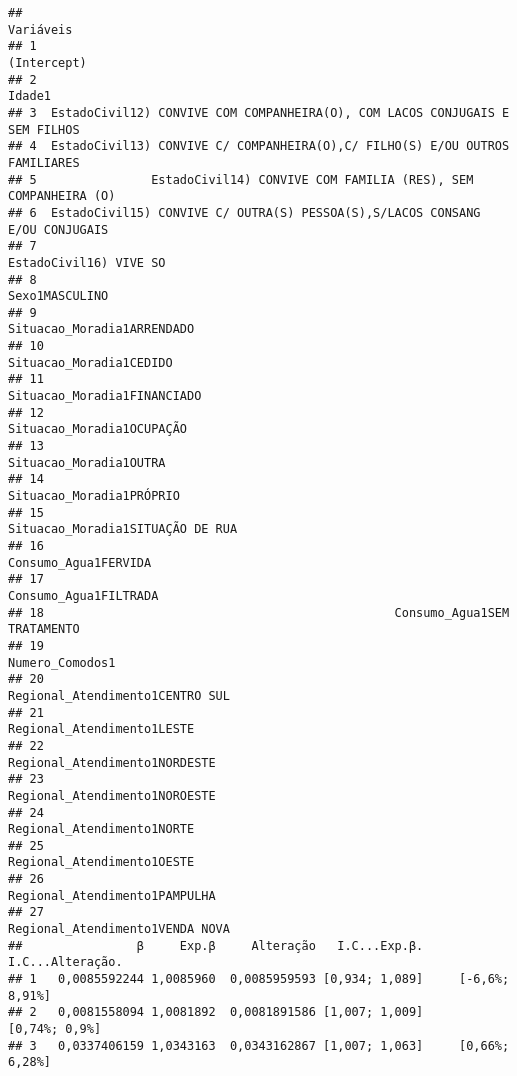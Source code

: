 \documentclass[
]{article}
\begin{document}
\begin{verbatim}
##                                                                      Variáveis
## 1                                                                  (Intercept)
## 2                                                                       Idade1
## 3  EstadoCivil12) CONVIVE COM COMPANHEIRA(O), COM LACOS CONJUGAIS E SEM FILHOS
## 4  EstadoCivil13) CONVIVE C/ COMPANHEIRA(O),C/ FILHO(S) E/OU OUTROS FAMILIARES
## 5                EstadoCivil14) CONVIVE COM FAMILIA (RES), SEM COMPANHEIRA (O)
## 6  EstadoCivil15) CONVIVE C/ OUTRA(S) PESSOA(S),S/LACOS CONSANG E/OU CONJUGAIS
## 7                                                       EstadoCivil16) VIVE SO
## 8                                                               Sexo1MASCULINO
## 9                                                   Situacao_Moradia1ARRENDADO
## 10                                                     Situacao_Moradia1CEDIDO
## 11                                                 Situacao_Moradia1FINANCIADO
## 12                                                   Situacao_Moradia1OCUPAÇÃO
## 13                                                      Situacao_Moradia1OUTRA
## 14                                                    Situacao_Moradia1PRÓPRIO
## 15                                            Situacao_Moradia1SITUAÇÃO DE RUA
## 16                                                        Consumo_Agua1FERVIDA
## 17                                                       Consumo_Agua1FILTRADA
## 18                                                 Consumo_Agua1SEM TRATAMENTO
## 19                                                             Numero_Comodos1
## 20                                             Regional_Atendimento1CENTRO SUL
## 21                                                  Regional_Atendimento1LESTE
## 22                                               Regional_Atendimento1NORDESTE
## 23                                               Regional_Atendimento1NOROESTE
## 24                                                  Regional_Atendimento1NORTE
## 25                                                  Regional_Atendimento1OESTE
## 26                                               Regional_Atendimento1PAMPULHA
## 27                                             Regional_Atendimento1VENDA NOVA
##                β     Exp.β     Alteração   I.C...Exp.β.   I.C...Alteração.
## 1   0,0085592244 1,0085960  0,0085959593 [0,934; 1,089]     [-6,6%; 8,91%]
## 2   0,0081558094 1,0081892  0,0081891586 [1,007; 1,009]      [0,74%; 0,9%]
## 3   0,0337406159 1,0343163  0,0343162867 [1,007; 1,063]     [0,66%; 6,28%]

\end{verbatim}
\end{document}
